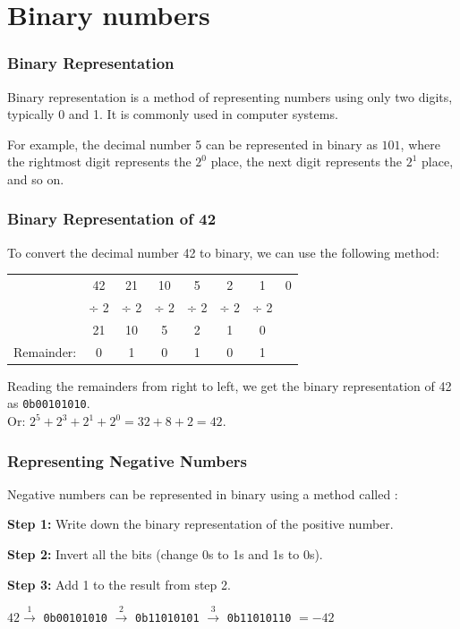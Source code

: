 \documentclass{beamer}
\begin{document}
\section{Binary numbers}
\begin{frame}
  \frametitle{Binary Representation}
  Binary representation is a method of representing numbers using only two digits, typically 0 and 1. It is commonly used in computer systems.\
  
  For example, the decimal number 5 can be represented in binary as \textbf{$101$}, where the rightmost digit represents the \textbf{$2^0$} place, the next digit represents the \textbf{$2^1$} place, and so on.\
\end{frame}
\begin{frame}
  \frametitle{Binary Representation of 42}
  To convert the decimal number 42 to binary, we can use the following method:
  
  \vspace{0.5cm}
  
  \begin{tabular}{c c c c c c c c }
  &42 & 21 & 10 & 5 & 2 & 1 & 0 \\ 
  &÷ 2 & ÷ 2 & ÷ 2 & ÷ 2 & ÷ 2 & ÷ 2 & \\\hline
  &21 & 10 & 5 & 2 & 1 & 0 & \\
  Remainder: & 0 &  1 &  0 &  1 &  0 &  1 & \\
  \end{tabular}
  \vspace{0.5cm}

  Reading the remainders from right to left, we get the binary representation of 42 as \texttt{0b00101010}.\\Or: $2^5 + 2^3 + 2^1 + 2^0 = 32 + 8 + 2= 42$.	
  \end{frame}
  \begin{frame}
    \frametitle{Representing Negative Numbers}
    
    Negative numbers can be represented in binary using a method called :
    
    \vspace{0.5cm}
    
    \textbf{Step 1:} Write down the binary representation of the positive number.
    
    \textbf{Step 2:} Invert all the bits (change 0s to 1s and 1s to 0s).
    
    \textbf{Step 3:} Add 1 to the result from step 2.
    
    \vspace{0.5cm}
    $42 \xrightarrow{1}$ \texttt{0b00101010} $\xrightarrow{2}$ \texttt{0b11010101} $\xrightarrow{3}$ \texttt{0b11010110} $=-42$
\end{frame}
\end{document}
